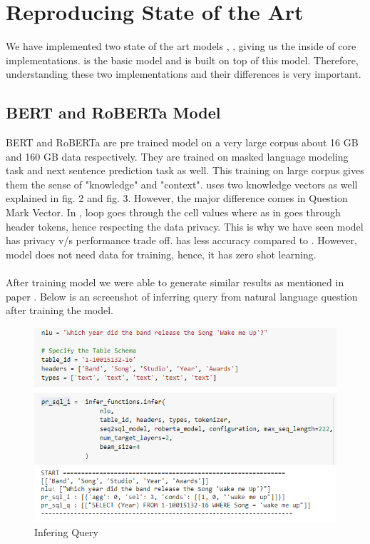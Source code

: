 \documentclass[12pt]{article}
\begin{document}
\section{Reproducing State of the Art}

We have implemented two state of the art models \cite{guo2019content}, \cite{liu2019roberta}, giving us the inside of core implementations. \cite{guo2019content} is the basic model and \cite{liu2019roberta} is built on top of this model. Therefore, understanding these two implementations and their differences is very important. 

\subsection{BERT and RoBERTa Model}

BERT and RoBERTa are pre trained model on a very large corpus about 16 GB and 160 GB data respectively. They are trained on masked language modeling task and next sentence prediction task as well. This training on large corpus gives them the sense of "knowledge" and "context". \cite{guo2019content} uses two knowledge vectors as well explained in fig. 2 and fig. 3. However, the major difference comes in Question Mark Vector. In \cite{guo2019content}, loop goes through the cell values where as in  \cite{pal2020data} goes through header tokens, hence respecting the data privacy. This is why we have seen  \cite{pal2020data} model has privacy v/s performance trade off.  \cite{pal2020data} has less accuracy compared to \cite{guo2019content}. However, \cite{pal2020data} model does not need data for training, hence, it has zero shot learning. 
\\
\\
After training model we were able to generate similar results as mentioned in paper \cite{pal2020data}. Below is an screenshot of inferring query from natural language question after training the model. 


\begin{figure}[H]
    \includegraphics[width=400pt]{infer}
    \caption{Infering Query}
    \label{fig:Infering Query}
\end{figure}
\end{document}

